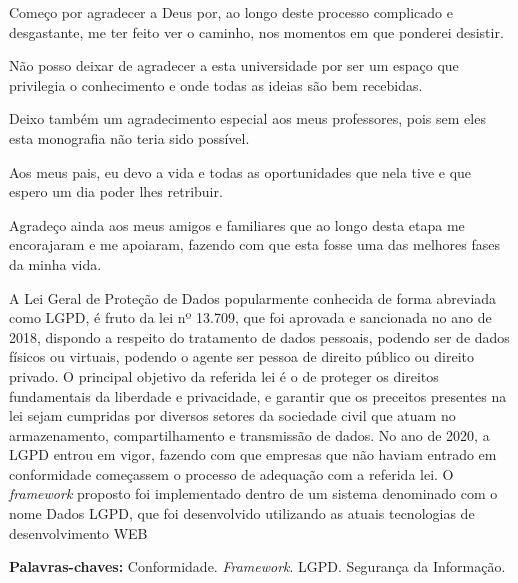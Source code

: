 \documentclass[
	12pt,				%
	openright,			%
	oneside,			%
	a4paper,			%
	english,			%
	french,				%
	spanish,			%
	brazil,				%
	]{abntex2}
\begin{document}
\begin{agradecimentos}

Começo por agradecer a Deus por, ao longo deste processo complicado e desgastante, me ter feito ver o caminho, nos momentos em que ponderei desistir.

Não posso deixar de agradecer a esta universidade por ser um espaço que privilegia o conhecimento e onde todas as ideias são bem recebidas.

Deixo também um agradecimento especial aos meus professores, pois sem eles esta monografia não teria sido possível.

Aos meus pais, eu devo a vida e todas as oportunidades que nela tive e que espero um dia poder lhes retribuir.

Agradeço ainda aos meus amigos e familiares que ao longo desta etapa me encorajaram e me apoiaram, fazendo com que esta fosse uma das melhores fases da minha vida.

\end{agradecimentos}



\begin{resumo}
\noindent
A Lei Geral de Proteção de Dados popularmente conhecida de forma abreviada como LGPD, é fruto da lei nº 13.709, que foi aprovada e sancionada no ano de 2018, dispondo a respeito do tratamento de dados pessoais, podendo ser de dados físicos ou virtuais, podendo o agente ser pessoa de direito público ou direito privado. O principal objetivo da referida lei é o de proteger os direitos fundamentais da liberdade e privacidade, e garantir que os preceitos presentes na lei sejam cumpridas por diversos setores da sociedade civil que atuam no armazenamento, compartilhamento e transmissão de dados. No ano de 2020, a LGPD entrou em vigor, fazendo com que empresas que não haviam entrado em conformidade começassem o processo de adequação com a referida lei. O \textit{framework} proposto foi implementado dentro de um sistema denominado com o nome Dados LGPD, que foi desenvolvido utilizando as atuais tecnologias de desenvolvimento WEB

 \vspace{\onelineskip}
    
 \noindent
 \textbf{Palavras-chaves:} Conformidade. \textit{Framework}. LGPD. Segurança da Informação.
\end{resumo}
\end{document}
